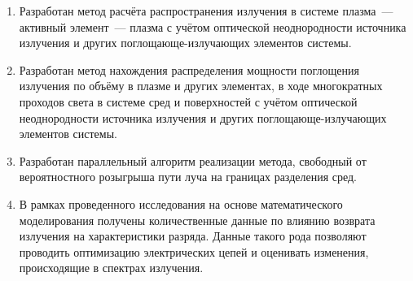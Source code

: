 \begin{enumerate}
	\item Разработан метод расчёта распространения излучения в системе плазма~— активный элемент~— плазма с учётом оптической неоднородности источника излучения и других поглощающе-излучающих элементов системы.

	\item Разработан метод нахождения распределения мощности поглощения излучения по объёму в плазме и других элементах, в ходе многократных проходов света в системе сред и поверхностей с учётом оптической неоднородности источника излучения и других поглощающе-излучающих элементов системы.

	\item Разработан параллельный алгоритм реализации метода, свободный от вероятностного розыгрыша пути луча на границах разделения сред.


	\item В рамках проведенного исследования на основе математического моделирования получены количественные данные по влиянию возврата излучения на характеристики разряда.
	Данные такого рода позволяют проводить оптимизацию электрических цепей и оценивать изменения, происходящие в спектрах излучения.
\end{enumerate}
